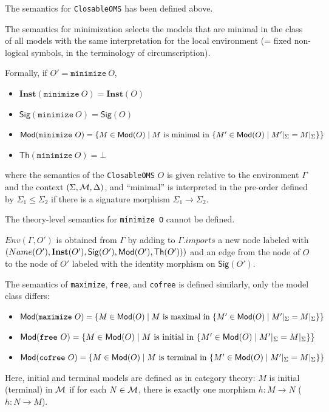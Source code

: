 \documentclass[10pt,fleqn,final]{scrreprt}
\newcommand*{\syntax}[1]{\texttt{#1}}
\newcommand{\Sig}{\mathsf{Sig}}
\renewcommand{\Th}{\mathsf{Th}}
\newcommand{\Inst}{\ensuremath{\mathbf{Inst}}}
\newcommand{\semdom}[1]{
\begin{center}
\fbox{$#1$}
\end{center}
}
\newenvironment{definitions}[0]{\medskip }{}
\begin{document}
\begin{definitions}
 
\semdom{sem(\Gamma, (\Sigma, \cM, \Delta), \syntax{ExtendingOMS})=
(\Gamma',(\cI,\Sigma',\cM', \Delta'))}

The semantics for \syntax{ClosableOMS} has been defined above.

The semantics for minimization selects the models that are minimal
in the class of all models with the same interpretation for the
local environment (= fixed non-logical symbols, in the terminology of circumscription).

Formally, if $O' = \syntax{minimize}\ O$, 
\begin{itemize}
 \item $\Inst(\syntax{minimize}\ O)= \Inst(O)$
 \item $\Sig(\syntax{minimize}\ O) = \Sig(O)$
 \item $\Mod( \syntax{minimize}\ O) = 
        \{ M \in  \Mod(O) \mid  M \text{ is minimal in } \{M' \in \Mod(O) \mid M'\forget\Sigma = M\forget\Sigma\}\}$
 \item $\Th( \syntax{minimize}\ O) = \bot$ 
\end{itemize}
\noindent where the semantics of the \syntax{ClosableOMS} $O$ is given relative to 
the environment
$\Gamma$ and the context $(\Sigma, {\cal M}, \Delta)$, and ``minimal''
is interpreted in the pre-order defined by $\Sigma_1\leq\Sigma_2$
if there is a signature morphism $\Sigma_1\to\Sigma_2$.

The theory-level semantics for  \syntax{minimize O} cannot be defined.

$Env(\Gamma, O')$ is obtained from $\Gamma$ by adding to $\Gamma.imports$ a new
node labeled with $(Name(O'), \Inst(O'),\allowbreak \Sig(O'), \Mod(O'), \Th(O')))$ and
an edge from the node of $O$ to the node of $O'$ labeled with the identity
morphism on $\Sig(O')$.


The semantics of \syntax{maximize}, \syntax{free}, and \syntax{cofree}
is defined similarly, only the model class differs:
\begin{itemize}
\item
$\Mod( \syntax{maximize}\ O) = 
        \{ M \in  \Mod(O) \mid  M \text{ is maximal in } \{M' \in \Mod(O) \mid M'\forget\Sigma = M\forget\Sigma\}\}$
\item
$\Mod( \syntax{free}\ O) = 
        \{ M \in  \Mod(O) \mid  M \text{ is initial in } \{M' \in \Mod(O) \mid M'\forget\Sigma = M\forget\Sigma\}\}$
\item
$\Mod( \syntax{cofree}\ O) = 
        \{ M \in  \Mod(O) \mid  M \text{ is terminal in } \{M' \in \Mod(O) \mid M'\forget\Sigma = M\forget\Sigma\}\}$
\end{itemize}
Here, initial and terminal models are defined as in
category theory: $M$ is initial (terminal) in ${\cal M}$ if for each 
$N\in{\cal M}$, there is exactly one morphism $h:M\to N$ ($h:N\to M$).


\end{definitions}
\end{document}
